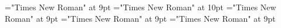 \documentclass[gps1,twoside]{article}
\begin{document}
\font\spanspanspansensespanspansubentrysubentriesdiventryletData="Times New Roman" at 9pt
\font\spanenspanspanspansensespanspansubentrysubentriesdiventryletData="Times New Roman" at 10pt
\font\spanabbreviationsemanticdomainsemanticdomainssensesensessensesensessubentrysubentriesentrylastchildafterspanspanspansensespanspansubentrysubentriesdiventryletData="Times New Roman" at 9pt
\font\spannameacademicdomainacademicdomainssensesensessensesensessubentrysubentriesentryfirstchildbeforespanspanspansensespanspansubentrysubentriesdiventryletData="Times New Roman" at 9pt
\font\spannameacademicdomainacademicdomainssensesensessensesensessubentrysubentriesentrylastchildafterspanspanspansensespanspansubentrysubentriesdiventryletData="Times New Roman" at 9pt

\mbox{} 
\newpage 
\newpage 
\setcounter{page}{1} 
\pagestyle{fancy} 
\begin{spacing}{0.916666666666667}\begin{center}\begin{spacing}{0.5}\begin{center}

\section*{}\end{center}\end{spacing}
\end{center}\end{spacing}\setlength{\columnsep}{12pt} 
\setlength\columnseprule{0.4pt} 
\end{document}

